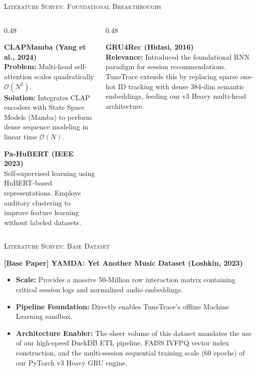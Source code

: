 \documentclass[xcolor=dvipsnames, aspectratio=1610]{beamer}
\begin{document}
\begin{frame}{\textsc{Literature Survey: Foundational Breakthroughs}}

  \begin{columns}[T]
    \begin{column}{0.48\textwidth}
      \begin{ExampleBox}
        \textbf{CLAPMamba (Yang et al., 2024)} \\
        \textbf{Problem:} Multi-head self-attention scales quadratically $\mathcal{O}(N^2)$. \\
        \textbf{Solution:} Integrates CLAP encoders with State Space Models (Mamba) to perform dense sequence modeling in linear time $\mathcal{O}(N)$.
      \end{ExampleBox}
      \vspace{1mm}
      \begin{CommentBox}
        \textbf{Pa-HuBERT (IEEE 2023)} \\
        Self-supervised learning using HuBERT-based representations. Employs auditory clustering to improve feature learning without labeled datasets.
      \end{CommentBox}
    \end{column}

    \begin{column}{0.48\textwidth}
      \begin{ProposalBox}
        \textbf{GRU4Rec (Hidasi, 2016)} \\
        \textbf{Relevance:} Introduced the foundational RNN paradigm for session recommendations. TuneTrace extends this by replacing sparse one-hot ID tracking with dense 384-dim semantic embeddings, feeding our v3 Heavy multi-head architecture.
      \end{ProposalBox}
    \end{column}
  \end{columns}

\end{frame}

\begin{frame}{\textsc{Literature Survey: Base Dataset}}

  \begin{ExampleBox}
    \textbf{[Base Paper] YAMDA: Yet Another Music Dataset (Loshkin, 2023)}
    \vspace{2mm}
    \begin{itemize}
        \item \textbf{Scale:} Provides a massive 50-Million row interaction matrix containing critical session logs and normalized audio embeddings.
        \item \textbf{Pipeline Foundation:} Directly enables TuneTrace's offline Machine Learning sandbox.
        \item \textbf{Architecture Enabler:} The sheer volume of this dataset mandates the use of our high-speed DuckDB ETL pipeline, FAISS IVFPQ vector index construction, and the multi-session sequential training scale (60 epochs) of our PyTorch v3 Heavy GRU engine.
    \end{itemize}
  \end{ExampleBox}

\end{frame}
\end{document}
